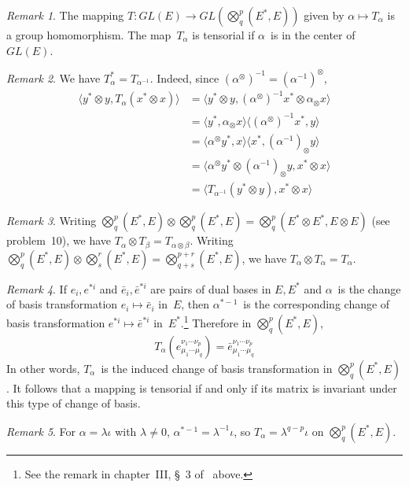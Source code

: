 \documentclass[letterpaper,12pt]{article}
\newcommand{\tprod}{\otimes}
\newcommand{\bigtprod}{\bigotimes}
\newcommand{\medtprod}{{\textstyle\bigtprod}}
\newcommand{\sprod}[2]{\langle#1,#2\rangle}
\theoremstyle{definition}
\theoremstyle{remark}
\newtheorem*{rmk}{Remark}
\begin{document}
\begin{rmk}
The mapping \(T:GL(E)\to GL(\medtprod^p_q(E^*,E))\) given by \(\alpha\mapsto T_{\alpha}\) is a group homomorphism. The map~\(T_{\alpha}\) is tensorial if \(\alpha\)~is in the center of~\(GL(E)\).
\end{rmk}

\begin{rmk}
We have \(T_{\alpha}^*=T_{\alpha^{-1}}\). Indeed, since \((\alpha^{\tprod})^{-1}=(\alpha^{-1})^{\tprod}\),
\begin{align*}
\sprod{y^*\tprod y}{T_{\alpha}(x^*\tprod x)}&=\sprod{y^*\tprod y}{(\alpha^{\tprod})^{-1}x^*\tprod\alpha_{\tprod}x}\\
	&=\sprod{y^*}{\alpha_{\tprod}x}\sprod{(\alpha^{\tprod})^{-1}x^*}{y}\\
	&=\sprod{\alpha^{\tprod}y^*}{x}\sprod{x^*}{(\alpha^{-1})_{\tprod}y}\\
	&=\sprod{\alpha^{\tprod}y^*\tprod(\alpha^{-1})_{\tprod}y}{x^*\tprod x}\\
	&=\sprod{T_{\alpha^{-1}}(y^*\tprod y)}{x^*\tprod x}
\end{align*}
\end{rmk}

\begin{rmk}
Writing \(\medtprod^p_q(E^*,E)\tprod\medtprod^p_q(E^*,E)=\medtprod^p_q(E^*\tprod E^*,E\tprod E)\) (see problem~10), we have \(T_{\alpha}\tprod T_{\beta}=T_{\alpha\tprod\beta}\). Writing \(\medtprod^p_q(E^*,E)\tprod\medtprod^r_s(E^*,E)=\medtprod^{p+r}_{q+s}(E^*,E)\), we have \(T_{\alpha}\tprod T_{\alpha}=T_{\alpha}\).
\end{rmk}

\begin{rmk}
If \(e_i,e^{*i}\) and \(\bar{e}_i,\bar{e}^{*i}\) are pairs of dual bases in \(E,E^*\) and \(\alpha\)~is the change of basis transformation \(e_i\mapsto\bar{e}_i\) in~\(E\), then \(\alpha^{*-1}\)~is the corresponding change of basis transformation \(e^{*i}\mapsto\bar{e}^{*i}\) in~\(E^*\).\footnote{See the remark in chapter~III, \S~3 of~\cite{greub1} above.} Therefore in \(\medtprod^p_q(E^*,E)\),
\[T_{\alpha}(e^{\nu_1\cdots\nu_p}_{\mu_1\cdots\mu_q})=\bar{e}^{\nu_1\cdots\nu_p}_{\mu_1\cdots\mu_q}\]
In other words, \(T_{\alpha}\)~is the induced change of basis transformation in \(\medtprod^p_q(E^*,E)\). It follows that a mapping is tensorial if and only if its matrix is invariant under this type of change of basis.
\end{rmk}

\begin{rmk}
For \(\alpha=\lambda\iota\) with \(\lambda\ne0\), \(\alpha^{*-1}=\lambda^{-1}\iota\), so \(T_{\alpha}=\lambda^{q-p}\iota\) on \(\medtprod^p_q(E^*,E)\).
\end{rmk}
\end{document}
